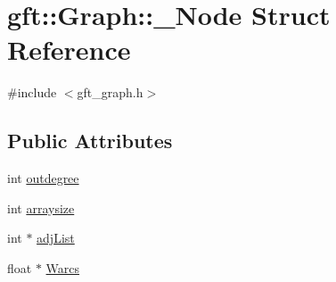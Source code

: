 \hypertarget{structgft_1_1Graph_1_1__Node}{\section{gft\-:\-:Graph\-:\-:\-\_\-\-Node Struct Reference}
\label{structgft_1_1Graph_1_1__Node}
}


{\ttfamily \#include $<$gft\-\_\-graph.\-h$>$}

\subsection*{Public Attributes}
\begin{DoxyCompactItemize}
\item 
int \hyperlink{structgft_1_1Graph_1_1__Node_ace8a528045d81543c6fe13a62d0bfb0d}{outdegree}
\item 
int \hyperlink{structgft_1_1Graph_1_1__Node_a3bf441dbd3109bb46136c4e413015cc3}{arraysize}
\item 
int $\ast$ \hyperlink{structgft_1_1Graph_1_1__Node_a50c5a52bde74c61eb535531e3b24146a}{adj\-List}
\item 
float $\ast$ \hyperlink{structgft_1_1Graph_1_1__Node_ae10ad39ff558acecac377de3a58da919}{Warcs}
\end{DoxyCompactItemize}


